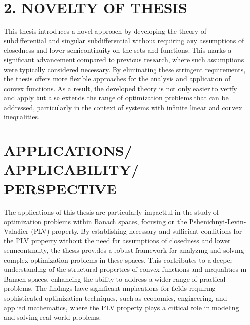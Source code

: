 \section*{2. NOVELTY OF THESIS}

This thesis introduces a novel approach by developing the theory of subdifferential and singular subdifferential without requiring any assumptions of closedness and lower semicontinuity on the sets and functions. This marks a significant advancement compared to previous research, where such assumptions were typically considered necessary. By eliminating these stringent requirements, the thesis offers more flexible approaches for the analysis and application of convex functions. As a result, the developed theory is not only easier to verify and apply but also extends the range of optimization problems that can be addressed, particularly in the context of systems with infinite linear and convex inequalities.

\section*{APPLICATIONS/ APPLICABILITY/ PERSPECTIVE}

The applications of this thesis are particularly impactful in the study of optimization problems within Banach spaces, focusing on the Pshenichnyi-Levin-Valadier (PLV) property. By establishing necessary and sufficient conditions for the PLV property without the need for assumptions of closedness and lower semicontinuity, the thesis provides a robust framework for analyzing and solving complex optimization problems in these spaces. This contributes to a deeper understanding of the structural properties of convex functions and inequalities in Banach spaces, enhancing the ability to address a wider range of practical problems. The findings have significant implications for fields requiring sophisticated optimization techniques, such as economics, engineering, and applied mathematics, where the PLV property plays a critical role in modeling and solving real-world problems.

